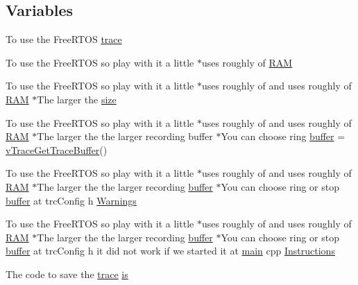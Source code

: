 \subsection*{Variables}
\begin{DoxyCompactItemize}
\item 
To use the Free\+R\+T\+OS \hyperlink{trace_2readme_8txt_aab7bcc83643280624f762e053e1b2686}{trace}
\item 
To use the Free\+R\+T\+OS so play with it a little $\ast$uses roughly of \hyperlink{trace_2readme_8txt_a17f7301b9acba7201908dab292b43f58}{R\+AM}
\item 
To use the Free\+R\+T\+OS so play with it a little $\ast$uses roughly of and uses roughly of \hyperlink{trace_2readme_8txt_a17f7301b9acba7201908dab292b43f58}{R\+AM} $\ast$The larger the \hyperlink{trace_2readme_8txt_a5b63272b2fdc1bee3a5c822dfc08d754}{size}
\item 
To use the Free\+R\+T\+OS so play with it a little $\ast$uses roughly of and uses roughly of \hyperlink{trace_2readme_8txt_a17f7301b9acba7201908dab292b43f58}{R\+AM} $\ast$The larger the the larger recording buffer $\ast$You can choose ring \hyperlink{trace_2readme_8txt_a957c4a9f1964467acd0f88955116b588}{buffer} = \hyperlink{trcUser_8h_ac0e8710931d5a1084ffa076f75ba035c}{v\+Trace\+Get\+Trace\+Buffer}()
\item 
To use the Free\+R\+T\+OS so play with it a little $\ast$uses roughly of and uses roughly of \hyperlink{trace_2readme_8txt_a17f7301b9acba7201908dab292b43f58}{R\+AM} $\ast$The larger the the larger recording \hyperlink{trace_2readme_8txt_a957c4a9f1964467acd0f88955116b588}{buffer} $\ast$You can choose ring or stop \hyperlink{trace_2readme_8txt_a957c4a9f1964467acd0f88955116b588}{buffer} at trc\+Config h \hyperlink{trace_2readme_8txt_ad6faecc4c34426783188b0ad8552a8d8}{Warnings}
\item 
To use the Free\+R\+T\+OS so play with it a little $\ast$uses roughly of and uses roughly of \hyperlink{trace_2readme_8txt_a17f7301b9acba7201908dab292b43f58}{R\+AM} $\ast$The larger the the larger recording \hyperlink{trace_2readme_8txt_a957c4a9f1964467acd0f88955116b588}{buffer} $\ast$You can choose ring or stop \hyperlink{trace_2readme_8txt_a957c4a9f1964467acd0f88955116b588}{buffer} at trc\+Config h it did not work if we started it at \hyperlink{startup_8cpp_ae66f6b31b5ad750f1fe042a706a4e3d4}{main} cpp \hyperlink{trace_2readme_8txt_a01807876ea43790d1481e4f6b6e7b08f}{Instructions}
\item 
The code to save the \hyperlink{trace_2readme_8txt_aab7bcc83643280624f762e053e1b2686}{trace} \hyperlink{trace_2readme_8txt_a7e33a55c77d8cbd03ec57a69d78a39dc}{is}

\end{DoxyCompactItemize}
